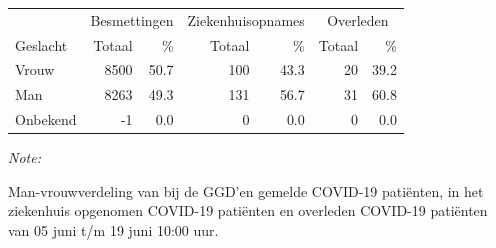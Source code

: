 \documentclass[
  english,
  man,floatsintext]{apa6}
\begin{document}
\begin{table}
\centering\begingroup\fontsize{11}{13}\selectfont

\begin{threeparttable}
\begin{tabular}{lrrrrrr}
\toprule
\multicolumn{1}{c}{ } & \multicolumn{2}{c}{Besmettingen} & \multicolumn{2}{c}{Ziekenhuisopnames} & \multicolumn{2}{c}{Overleden} \\
\cmidrule(l{3pt}r{3pt}){2-3} \cmidrule(l{3pt}r{3pt}){4-5} \cmidrule(l{3pt}r{3pt}){6-7}
Geslacht & Totaal & \% & Totaal & \% & Totaal & \%\\
\midrule
Vrouw & 8500 & 50.7 & 100 & 43.3 & 20 & 39.2\\
Man & 8263 & 49.3 & 131 & 56.7 & 31 & 60.8\\
Onbekend & -1 & 0.0 & 0 & 0.0 & 0 & 0.0\\
\bottomrule
\end{tabular}
\begin{tablenotes}
\item \textit{Note: } 
\item Man-vrouwverdeling van bij de GGD’en gemelde COVID-19 patiënten, in het ziekenhuis opgenomen COVID-19 patiënten en overleden COVID-19 patiënten van 05 juni t/m 19 juni 10:00 uur.
\end{tablenotes}
\end{threeparttable}
\endgroup{}
\end{table}
\newpage
\end{document}
